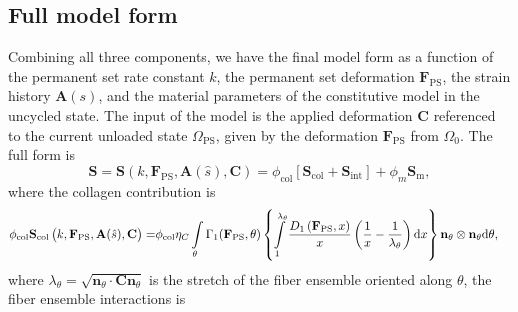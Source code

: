 \subsection{Full model form}
	Combining all three components, we have the final model form as a function of the permanent set rate constant $k $, the permanent set deformation $\mathbf{F}_\mathrm{PS}$, the strain history $\mathbf{A}(s)$, and the material parameters of the constitutive model in the uncycled state. The input of the model is the applied deformation $\mathbf{C}$ referenced to the current unloaded state $\Omega_\mathrm{PS}$, given by the deformation $\mathbf{F}_\mathrm{PS}$ from $\Omega_0$. The full form is
\begin{equation}\label{eq:fullEXLmodel}
\mathbf{S} = \mathbf{S}\left(k , \mathbf{F}_\mathrm{PS}, \mathbf{A}(\hat{s}), \mathbf{C}\right) = \phi_\mathrm{col} \left[ \mathbf{S}_\mathrm{col} + \mathbf{S}_\mathrm{int}\right] + \phi_m \mathbf{S}_\mathrm{m},
\end{equation}
where the collagen contribution is 
\begin{equation} \label{eq:fullcollagen}
\begin{split}
\phi_\mathrm{col}\mathbf{S}_\mathrm{col}\left(k , \mathbf{F}_\mathrm{PS}, \mathbf{A}(\hat{s}), \mathbf{C}\right) =& \phi_\mathrm{col} \eta_C \int\displaylimits_\theta \Gamma_1(\mathbf{F}_{\mathrm{PS}}, \theta)\left\lbrace 
\int\displaylimits_1^{\lambda_\theta} \frac{D_1\left( \mathbf{F}_{\mathrm{PS}}, x \right)}{x} \left( \frac{1}{x}- \frac{1}{\lambda_\theta}\right) \mathrm{d}x \right\rbrace \mathbf{n}_\theta\otimes\mathbf{n}_\theta \mathrm{d}\theta,
\end{split}
\end{equation}
where $\lambda_\theta = \sqrt{\mathbf{n}_\theta \cdot \mathbf{C}\mathbf{n}_\theta}$ is the stretch of the fiber ensemble oriented along $\theta$, the fiber ensemble interactions is 
